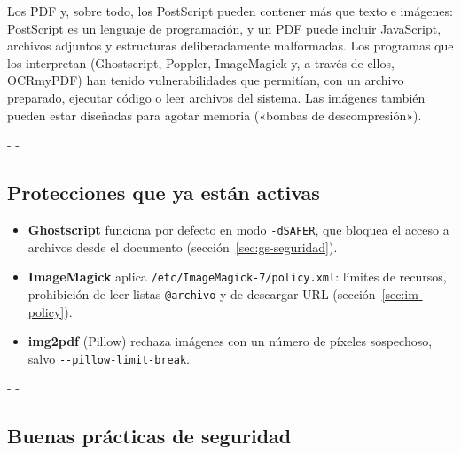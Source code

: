 \documentclass[11pt,a4paper]{article}
\makeatletter
\newcommand{\necesitaespacio}[1]{\par\penalty-100\begingroup
	\setlength{\dimen@}{#1}\dimen@ii\pagegoal\advance\dimen@ii-\pagetotal
	\ifdim\dimen@>\dimen@ii\ifdim\dimen@ii>\z@\vfil\fi\penalty-\@M\fi\endgroup}
\newcommand{\opt}[1]{\texttt{\textcolor{colopt}{#1}}}      %
\newcommand{\arch}[1]{\texttt{\textcolor{colarch}{#1}}}    %
\makeatother
\begin{document}
	Los PDF y, sobre todo, los PostScript pueden contener más que texto e imágenes: PostScript es un lenguaje de programación, y un PDF puede incluir JavaScript, archivos adjuntos y estructuras deliberadamente malformadas. Los programas que los interpretan (Ghostscript, Poppler, ImageMagick y, a través de ellos, OCRmyPDF) han tenido vulnerabilidades que permitían, con un archivo preparado, ejecutar código o leer archivos del sistema. Las imágenes también pueden estar diseñadas para agotar memoria («bombas de descompresión»).
	
	\necesitaespacio{8\baselineskip}
	\subsection{Protecciones que ya están activas}
	
	\begin{itemize}
		\item \textbf{Ghostscript} funciona por defecto en modo \opt{-dSAFER}, que bloquea el acceso a archivos desde el documento (sección~\ref{sec:gs-seguridad}).
		\item \textbf{ImageMagick} aplica \arch{/\allowbreak{}etc/\allowbreak{}ImageMagick-\allowbreak{}7/\allowbreak{}policy.xml}: límites de recursos, prohibición de leer listas \arch{@archivo} y de descargar URL (sección~\ref{sec:im-policy}).
		\item \textbf{img2pdf} (Pillow) rechaza imágenes con un número de píxeles sospechoso, salvo \opt{-{}-pillow-\allowbreak{}limit-\allowbreak{}break}.
	\end{itemize}
	
	\necesitaespacio{8\baselineskip}
	\subsection{Buenas prácticas de seguridad}
	
\end{document}
